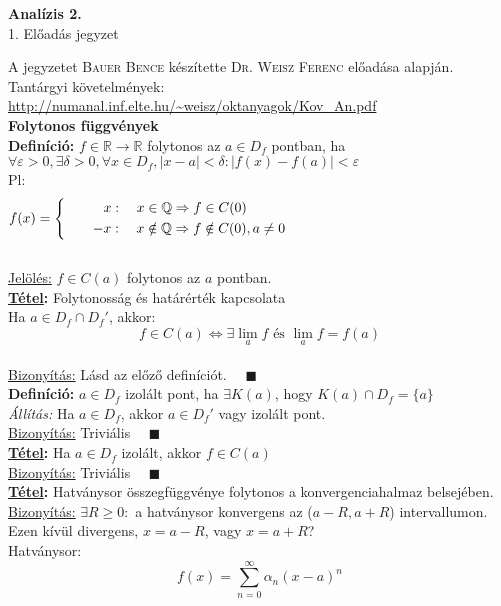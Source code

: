 \documentclass[a4paper,11pt]{article}
\begin{document}
\def\biz{\normalsize{\textbf{\underline{Bizonyítás:} }\hspace*{0.3cm}}}
\def\tetel{\large \textbf{Tétel: }}
\def\defi{\normalsize \textbf{Definíció: }}
\def\Z{\mathbb{Z}}
\def\R{\mathbb{R}}
\def\N{\mathbb{N}}
\def\Q{\mathbb{Q}}
\def\sumn{\displaystyle\sum_{n=0}^{\infty}}
\def\biz{\normalsize{\underline{Bizonyítás:} }\hspace*{0.5cm}}
\def\tetel{\normalsize \textbf{\underline{Tétel}: }}
\begin{center}
	{\LARGE\textbf{Analízis 2.}}\\[0.2cm]
	
	{\Large 1. Előadás jegyzet}\\[1cm]	
\end{center}
{\small A jegyzetet \textsc{Bauer Bence} készítette \textsc{Dr. Weisz Ferenc} előadása alapján.}\\[0.2cm]
Tantárgyi követelmények: \url{http://numanal.inf.elte.hu/~weisz/oktanyagok/Kov_An.pdf}\\[0.2cm]
\textbf{{\large Folytonos függvények}}\\[0.1cm]
\defi $f\in\R\to\R$ folytonos az $a\in D_f$ pontban, ha\\[0.2cm] $\forall\varepsilon>0,\exists\delta>0,\forall x\in D_f, |x-a|<\delta : |f(x)-f(a)|<\varepsilon$\\[0.1cm] Pl: \[\displaystyle f(x) = 
\left\{
\begin{gathered}
x: \quad x\in\Q\Rightarrow f\in C(0)\hspace{5.7cm} \\
\quad\quad-x: \quad x\notin\Q\Rightarrow f\notin C(0), a\neq 0\hspace{5.7cm}
\end{gathered}\right. \]\\[0.1cm]
\underline{Jelölés:}  $f\in C(a)$ folytonos az $a$ pontban.\\[0.2cm]
\tetel Folytonosság és határérték kapcsolata\\[0.1cm]
Ha $a\in D_f\cap D_f'$, akkor: \[ f\in C(a)\Leftrightarrow \exists\lim_a f \text{ és } \lim_a f=f(a)\]\\[0.1cm]
\biz Lásd az előző definíciót. $\quad\blacksquare$\\[0.3cm]
\defi $a\in D_f$ izolált pont, ha $\exists K(a)$, hogy $K(a)\cap D_f=\{a\}$\\[0.1cm] \textit{Állítás:} Ha $a\in D_f$, akkor $a\in D_f'$ vagy izolált pont.\\[0.1cm]\biz Triviális $\quad\blacksquare$\\[0.2cm] \tetel Ha $a\in D_f$ izolált, akkor $f\in C(a)$\\[0.1cm]\biz Triviális $\quad\blacksquare$\\[0.2cm] \tetel Hatványsor összegfüggvénye folytonos a konvergenciahalmaz belsejében.\\[0.1cm] \biz $\exists R\geq0:$ a hatványsor konvergens az ($a-R,a+R$) intervallumon.\\[0.1cm]Ezen kívül divergens, $x=a-R$, vagy $x=a+R$?\\[0.1cm]Hatványsor:\[f(x)=\sumn \alpha_n(x-a)^n\]
\end{document}
